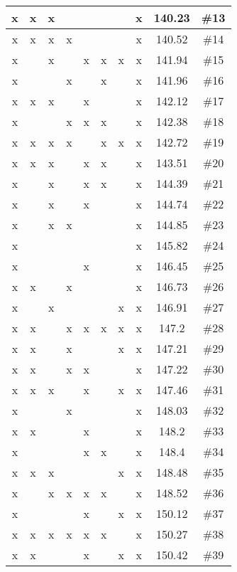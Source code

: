 \begin{center}
\begin{longtable}{|c|c|c|c|c|c|c|c|c|c|}
 x &  x &  x &  &  &  &  &  x & 140.23 & \#13 \\ \hline
 x &  x &  x &  x &  &  &  &  x & 140.52 & \#14 \\ \hline
 x &  &  x &  &  x &  x &  x &  x & 141.94 & \#15 \\ \hline
 x &  &  &  x &  &  x &  &  x & 141.96 & \#16 \\ \hline
 x &  x &  x &  &  x &  &  &  x & 142.12 & \#17 \\ \hline
 x &  &  &  x &  x &  x &  &  x & 142.38 & \#18 \\ \hline
 x &  x &  x &  x &  &  x &  x &  x & 142.72 & \#19 \\ \hline
 x &  x &  x &  &  x &  x &  &  x & 143.51 & \#20 \\ \hline
 x &  &  x &  &  x &  x &  &  x & 144.39 & \#21 \\ \hline
 x &  &  x &  &  x &  &  &  x & 144.74 & \#22 \\ \hline
 x &  &  x &  x &  &  &  &  x & 144.85 & \#23 \\ \hline
 x &  &  &  &  &  &  &  x & 145.82 & \#24 \\ \hline
 x &  &  &  &  x &  &  &  x & 146.45 & \#25 \\ \hline
 x &  x &  &  x &  &  &  &  x & 146.73 & \#26 \\ \hline
 x &  &  x &  &  &  &  x &  x & 146.91 & \#27 \\ \hline
 x &  x &  &  x &  x &  x &  x &  x & 147.2 & \#28 \\ \hline
 x &  x &  &  x &  &  &  x &  x & 147.21 & \#29 \\ \hline
 x &  x &  &  x &  x &  &  &  x & 147.22 & \#30 \\ \hline
 x &  x &  x &  &  x &  &  x &  x & 147.46 & \#31 \\ \hline
 x &  &  &  x &  &  &  &  x & 148.03 & \#32 \\ \hline
 x &  x &  &  &  x &  &  &  x & 148.2 & \#33 \\ \hline
 x &  &  &  &  x &  x &  &  x & 148.4 & \#34 \\ \hline
 x &  x &  x &  &  &  &  x &  x & 148.48 & \#35 \\ \hline
 x &  &  x &  x &  x &  x &  &  x & 148.52 & \#36 \\ \hline
 x &  &  &  &  x &  &  x &  x & 150.12 & \#37 \\ \hline
 x &  x &  x &  x &  x &  x &  &  x & 150.27 & \#38 \\ \hline
 x &  x &  &  &  x &  &  x &  x & 150.42 & \#39 \\ \hline

\end{longtable}
\end{center}
